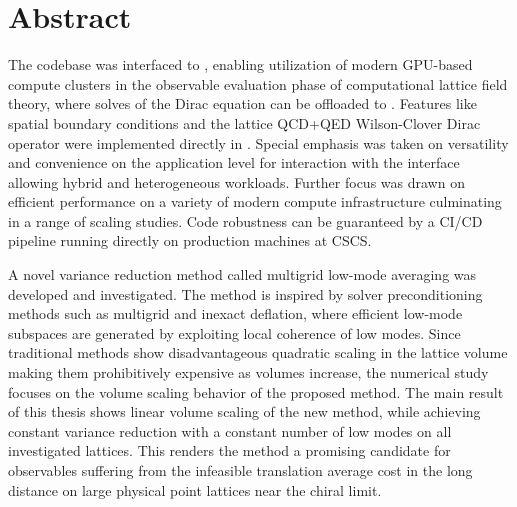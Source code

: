 \begingroup
\let\clearpage\relax
\let\cleardoublepage\relax
\let\cleardoublepage\relax

\chapter*{Abstract}

The \openqxd codebase was interfaced to \quda, enabling utilization of modern GPU-based compute clusters in the observable evaluation phase of computational lattice field theory, where solves of the Dirac equation can be offloaded to \quda.
Features like spatial \Cstar boundary conditions and the lattice QCD+QED Wilson-Clover Dirac operator were implemented directly in \quda.
Special emphasis was taken on versatility and convenience on the application level for interaction with the interface allowing hybrid and heterogeneous workloads.
Further focus was drawn on efficient performance on a variety of modern compute infrastructure culminating in a range of scaling studies.
Code robustness can be guaranteed by a CI/CD pipeline running directly on production machines at CSCS.

A novel variance reduction method called multigrid low-mode averaging was developed and investigated.
The method is inspired by solver preconditioning methods such as multigrid and inexact deflation, where efficient low-mode subspaces are generated by exploiting local coherence of low modes.
Since traditional methods show disadvantageous quadratic scaling in the lattice volume making them prohibitively expensive as volumes increase, the numerical study focuses on the volume scaling behavior of the proposed method.
The main result of this thesis shows linear volume scaling of the new method, while achieving constant variance reduction with a constant number of low modes on all investigated lattices.
This renders the method a promising candidate for observables suffering from the infeasible translation average cost in the long distance on large physical point lattices near the chiral limit.

\endgroup

\cleardoublepage%

\begingroup
\let\clearpage\relax
\let\cleardoublepage\relax
\let\cleardoublepage\relax

